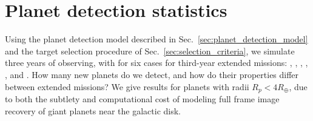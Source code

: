 \section{Planet detection statistics}  
\label{sec:newly_detected_planet_metrics}

Using the planet detection model described in Sec.~\ref{sec:planet_detection_model} and the target selection procedure of Sec.~\ref{sec:selection_criteria}, we simulate three years of \tess observing, with for six cases for third-year extended missions: \nhemi, \npole, \shemiAvoid, \elong, \eshort, and \hemis.
How many new planets do we detect, and how do their properties differ between extended missions?
We give results for planets with radii $R_p < 4R_\oplus$, due to both the subtlety and computational cost of modeling full frame image recovery of giant planets near the galactic disk.








